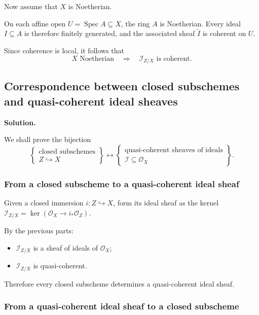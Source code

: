 Now assume that \(X\) is Noetherian.

On each affine open \(U=\operatorname{Spec}A\subseteq X\), the ring
\(A\) is Noetherian. Every ideal \(I\subseteq A\) is therefore finitely
generated, and the associated sheaf \(\widetilde I\) is coherent on \(U\).

Since coherence is local, it follows that
\[
\boxed{
	X\text{ Noetherian}
	\quad\Longrightarrow\quad
	\mathcal{I}_{Z/X}
	\text{ is coherent.}
}
\]

\subsection{Correspondence between closed subschemes and quasi-coherent ideal sheaves}

\textbf{Solution.}

We shall prove the bijection
\[
\boxed{
	\left\{
	\begin{array}{c}
		\text{closed subschemes}\\
		Z\hookrightarrow X
	\end{array}
	\right\}
	\longleftrightarrow
	\left\{
	\begin{array}{c}
		\text{quasi-coherent sheaves of ideals}\\
		\mathcal{I}\subseteq \mathcal{O}_X
	\end{array}
	\right\}.
}
\]

\subsubsection{From a closed subscheme to a quasi-coherent ideal sheaf}

Given a closed immersion \(i:Z\hookrightarrow X\), form its ideal
sheaf as the kernel
\(\mathcal{I}_{Z/X}=\ker(\mathcal{O}_X\longrightarrow i_*\mathcal{O}_Z)\).

By the previous parts:

\begin{itemize}
	\item \(\mathcal{I}_{Z/X}\) is a sheaf of ideals of \(\mathcal{O}_X\);
	\item \(\mathcal{I}_{Z/X}\) is quasi-coherent.
\end{itemize}

Therefore every closed subscheme determines a quasi-coherent ideal sheaf.

\subsubsection{From a quasi-coherent ideal sheaf to a closed subscheme}

